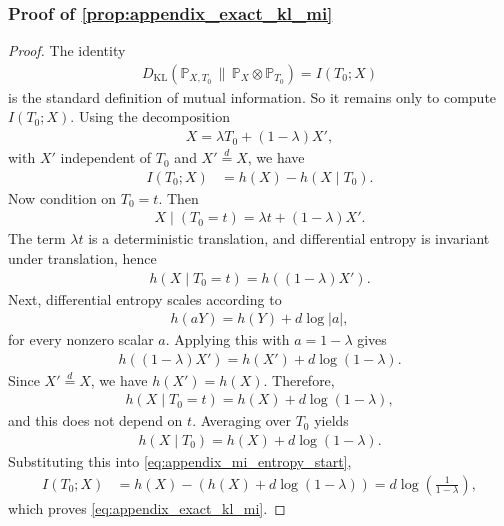 \documentclass{article}
\theoremstyle{plain}
\theoremstyle{definition}
\theoremstyle{plain}
\newcommand{\PP}{\mathbb P}
\begin{document}
\subsubsection{Proof of \cref{prop:appendix_exact_kl_mi}}
\label{proof:appendix_exact_kl_mi}
\begin{proof}
    The identity
    \begin{align}
        D_{\mathrm{KL}}(\PP_{X,T_0}\,\|\,\PP_X \otimes \PP_{T_0}) = I(T_0;X)
    \end{align}
    is the standard definition of mutual information.
    So it remains only to compute $I(T_0;X)$.
    Using the decomposition
    \begin{align}
        X = \lambda T_0 + (1-\lambda)X',
    \end{align}
    with $X'$ independent of $T_0$ and $X' \stackrel{d}{=} X$, we have
    \begin{align}
        I(T_0;X)
         & = h(X) - h(X\mid T_0).
        \label{eq:appendix_mi_entropy_start}
    \end{align}
    Now condition on $T_0=t$. Then
    \begin{align}
        X\mid(T_0=t) = \lambda t + (1-\lambda)X'.
    \end{align}
    The term $\lambda t$ is a deterministic translation, and differential entropy is invariant under translation, hence
    \begin{align}
        h(X\mid T_0=t) = h\left((1-\lambda)X'\right).
    \end{align}
    Next, differential entropy scales according to
    \begin{align}
        h(aY) = h(Y) + d\log|a|,
    \end{align}
    for every nonzero scalar $a$.
    Applying this with $a=1-\lambda$ gives
    \begin{align}
        h\left((1-\lambda)X'\right)
        = h(X') + d\log(1-\lambda).
    \end{align}
    Since $X' \stackrel{d}{=} X$, we have $h(X') = h(X)$. Therefore,
    \begin{align}
        h(X\mid T_0=t)
        = h(X) + d\log(1-\lambda),
    \end{align}
    and this does not depend on $t$. Averaging over $T_0$ yields
    \begin{align}
        h(X\mid T_0)
        = h(X) + d\log(1-\lambda).
    \end{align}
    Substituting this into \eqref{eq:appendix_mi_entropy_start},
    \begin{align}
        I(T_0;X)
         & = h(X) - \left(h(X) + d\log(1-\lambda)\right)
        = d\log\left(\frac{1}{1-\lambda}\right),
    \end{align}
    which proves \eqref{eq:appendix_exact_kl_mi}.
\end{proof}
\end{document}
